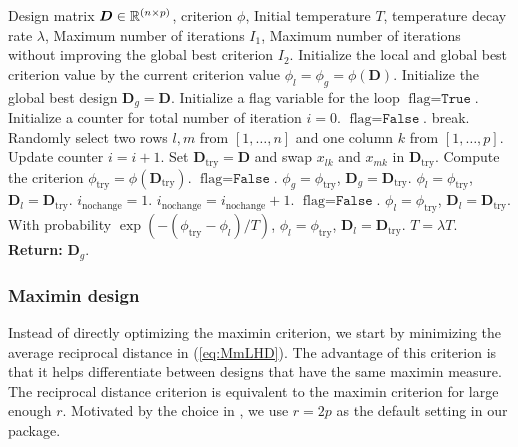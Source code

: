 \begin{algorithm}
   \caption{: simulated annealing for LHD}
   \label{alg:sa}
   \begin{algorithmic}[1]
   \Require Design matrix $\bm{D}\in\mathbb R^{(n\times p)}$, criterion $\phi$, Initial temperature $T$, temperature decay rate $\lambda$, Maximum number of iterations $I_1$, Maximum number of iterations without improving the global best criterion $I_2$.
        \State Initialize the local and global best criterion value by the current criterion value $\phi_l = \phi_g = \phi(\bm{D})$.
        \State Initialize the global best design $\bm{D}_g=\bm{D}$.
        \State Initialize a flag variable for the loop $\text{flag}=\texttt{True}$. 
        \State Initialize a counter for total number of iteration $i=0$.
            \State $\text{flag} = \texttt{False}$.
             break.\EndIf
            \State Randomly select two rows $l, m$ from $[1,\dots,n]$ and one column $k$ from $[1,\dots, p]$. 
            \State Update counter $i = i+1$.
            \State Set $\bm{D}_{\text{try}} = \bm{D}$ and swap $x_{lk}$ and $x_{mk}$ in $\bm{D}_{\text{try}}$.
            \State Compute the criterion $\phi_{\text{try}} = \phi(\bm{D}_{\text{try}})$.
                \State $\text{flag} = \texttt{False}$.
                \State $\phi_g = \phi_{\text{try}}$, $\bm{D}_g=\bm{D}_{\text{try}}$.
                \State $\phi_l = \phi_{\text{try}}$, $\bm{D}_l=\bm{D}_{\text{try}}$.
                \State $i_\text{nochange} = 1$.
            \Else
            \State $i_\text{nochange} = i_\text{nochange} + 1$.
                    \State $\text{flag} = \texttt{False}$.
                    \State $\phi_l = \phi_{\text{try}}$, $\bm{D}_l=\bm{D}_{\text{try}}$.
                \Else
                    \State With probability $\exp(-(\phi_{\text{try}}-\phi_l) / T)$, $\phi_l = \phi_{\text{try}}$, $\bm{D}_l=\bm{D}_{\text{try}}$.
                \EndIf
            \EndIf
            \EndWhile
            \State $T = \lambda T$.
        \EndWhile
   \State \textbf{Return:} $\bm{D}_g$.
\end{algorithmic}
\end{algorithm}


\subsubsection{Maximin design}
Instead of directly optimizing the maximin criterion, we start by minimizing the average reciprocal distance in (\ref{eq:MmLHD}). The advantage of this criterion is that it helps differentiate between designs that have the same maximin measure. The reciprocal distance criterion is equivalent to the maximin criterion for large enough $r$. Motivated by the choice in \cite{joseph2015maximum}, we use $r=2p$ as the default setting in our package.

